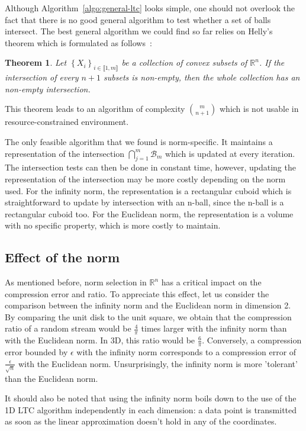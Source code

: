 \documentclass[10pt, conference, compsocconf]{IEEEtran}
\newcommand{\todo}[1]{\marginpar{\parbox{18mm}{\flushleft\tiny\color{red}\textbf{TODO}:
      #1}}}
\newtheorem*{theorem}{Theorem}
\begin{document}
Although Algorithm~\ref{algo:general-ltc} looks simple, one should not
overlook the fact that there is no good general algorithm to test
whether a set of balls intersect. The best general algorithm we could find
so far relies on Helly's theorem which is formulated as follows~\cite{helly1923mengen}:
\begin{theorem}
Let $\left\{ X_i \right\}_{i \in \llbracket 1, m \rrbracket}$ be a collection of convex subsets of $\mathbb{R}^n$. If the intersection of every $n+1$
subsets is non-empty, then the whole collection has an non-empty intersection.
\end{theorem}
This theorem leads to an algorithm of complexity ${m \choose n+1}$ which is
not usable in resource-constrained environment.

The only feasible algorithm that we found is norm-specific. It
maintains a representation of the intersection
$\bigcap_{j=1}^{m}{\mathcal{B}_m}$ which is updated at every iteration.
The intersection tests can then be done in constant time, however,
updating the representation of the intersection may be more costly
depending on the norm used. For the infinity norm, the representation
is a rectangular cuboid which is straightforward to update by
intersection with an n-ball, since the n-ball is a rectangular cuboid too.
For the Euclidean norm, the representation is a volume with no specific property,
which is more costly to maintain.

\subsection{Effect of the norm}

As mentioned before, norm selection in $\mathbb{R}^n$ has a critical
impact on the compression error and ratio. To appreciate this effect,
let us consider the comparison between the infinity norm and the
Euclidean norm in dimension 2. By comparing the unit disk to the unit
square, we obtain that the compression ratio of a random stream would
be $\frac{4}{\pi}$ times larger with the infinity norm than with the 
Euclidean norm. In 3D, this ratio would be $\frac{6}{\pi}$. Conversely, 
a compression error bounded by $\epsilon$ with the infinity norm 
corresponds to a compression error of $\frac{\epsilon}{\sqrt{n}}$ with 
the Euclidean norm. Unsurprisingly, the
infinity norm is more 'tolerant' than the Euclidean norm.

\todo{Perhaps add a figure}

It should also be noted that using the infinity norm boils down to the
use of the 1D LTC algorithm independently in each dimension: a data
point is transmitted as soon as the linear approximation doesn't hold
in any of the coordinates. \todo{This is unclear}
\end{document}
